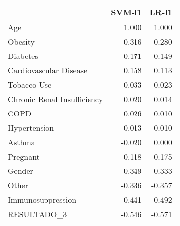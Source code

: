 \begin{tabular}{lrr}
\toprule
{} &  SVM-l1 &  LR-l1 \\
\midrule
Age                         &   1.000 &  1.000 \\
Obesity                     &   0.316 &  0.280 \\
Diabetes                    &   0.171 &  0.149 \\
Cardiovascular Disease      &   0.158 &  0.113 \\
Tobacco Use                 &   0.033 &  0.023 \\
Chronic Renal Insufficiency &   0.020 &  0.014 \\
COPD                        &   0.026 &  0.010 \\
Hypertension                &   0.013 &  0.010 \\
Asthma                      &  -0.020 &  0.000 \\
Pregnant                    &  -0.118 & -0.175 \\
Gender                      &  -0.349 & -0.333 \\
Other                       &  -0.336 & -0.357 \\
Immunosuppression           &  -0.441 & -0.492 \\
RESULTADO\_3                 &  -0.546 & -0.571 \\
\bottomrule
\end{tabular}
